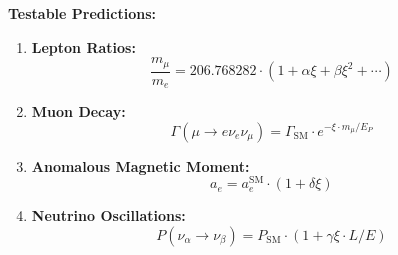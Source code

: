 	\begin{application}
		\textbf{Testable Predictions:}
		
		\begin{enumerate}
			\item \textbf{Lepton Ratios:}
			\begin{equation}
				\frac{m_\mu}{m_e} = 206.768282 \cdot (1 + \alpha \xi + \beta \xi^2 + \cdots)
			\end{equation}
			
			\item \textbf{Muon Decay:}
			\begin{equation}
				\Gamma(\mu \to e\nu_e\nu_\mu) = \Gamma_{\text{SM}} \cdot e^{-\xi \cdot m_\mu/E_P}
			\end{equation}
			
			\item \textbf{Anomalous Magnetic Moment:}
			\begin{equation}
				a_e = a_e^{\text{SM}} \cdot (1 + \delta \xi)
			\end{equation}
			
			\item \textbf{Neutrino Oscillations:}
			\begin{equation}
				P(\nu_\alpha \to \nu_\beta) = P_{\text{SM}} \cdot (1 + \gamma \xi \cdot L/E)
			\end{equation}
		\end{enumerate}
	\end{application}
	